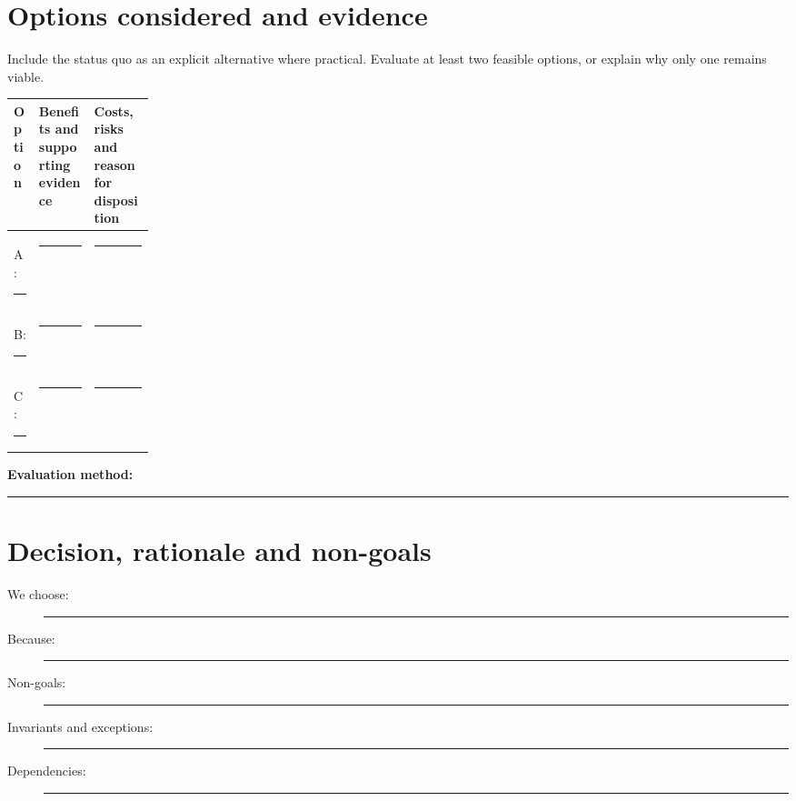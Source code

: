 \documentclass[11pt,letterpaper]{article}
\newcommand{\BlankResponse}{\rule[-0.4em]{0pt}{2em}\rule{0.65\linewidth}{0.4pt}}
\begin{document}
\section{Options considered and evidence}
Include the status quo as an explicit alternative where practical. Evaluate
at least two feasible options, or explain why only one remains viable.
\par\noindent\begin{tabularx}{\linewidth}{@{}>{\raggedright\arraybackslash}p{0.18\linewidth}>{\raggedright\arraybackslash}X >{\raggedright\arraybackslash}X@{}}
\toprule
\textbf{Option} & \textbf{Benefits and supporting evidence} & \textbf{Costs, risks and reason for disposition}\\
\midrule
A: \BlankResponse & \BlankResponse & \BlankResponse\\
B: \BlankResponse & \BlankResponse & \BlankResponse\\
C: \BlankResponse & \BlankResponse & \BlankResponse\\
\bottomrule
\end{tabularx}\par

\noindent\textbf{Evaluation method:} \BlankResponse

\section{Decision, rationale and non-goals}
\begin{description}
\item[We choose:] \BlankResponse
\item[Because:] \BlankResponse
\item[Non-goals:] \BlankResponse
\item[Invariants and exceptions:] \BlankResponse
\item[Dependencies:] \BlankResponse
\end{description}
\end{document}

